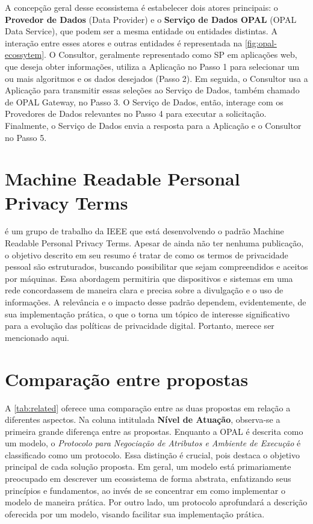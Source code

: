 A concepção geral desse ecossistema é estabelecer dois atores principais: o \textbf{Provedor de Dados} (Data Provider) e o \textbf{Serviço de Dados \acs{OPAL}} (OPAL Data Service), que podem ser a mesma entidade ou entidades distintas. A interação entre esses atores e outras entidades é representada na \autoref{fig:opal-ecossytem}. O Consultor, geralmente representado como \acs{SP} em aplicações web, que deseja obter informações, utiliza a Aplicação no Passo 1 para selecionar um ou mais algoritmos e os dados desejados (Passo 2). Em seguida, o Consultor usa a Aplicação para transmitir essas seleções ao Serviço de Dados, também chamado de OPAL Gateway, no Passo 3. O Serviço de Dados, então, interage com os Provedores de Dados relevantes no Passo 4 para executar a solicitação. Finalmente, o Serviço de Dados envia a resposta para a Aplicação e o Consultor no Passo 5.



\section{Machine Readable Personal Privacy Terms}

 é um grupo de trabalho da IEEE que está desenvolvendo o padrão Machine Readable Personal Privacy Terms. 
Apesar de ainda não ter nenhuma publicação, o objetivo descrito em seu resumo é tratar de como os termos de privacidade pessoal são estruturados, buscando possibilitar que sejam compreendidos e aceitos por máquinas.
Essa abordagem permitiria que dispositivos e sistemas em uma rede concordassem de maneira clara e precisa sobre a divulgação e o uso de informações. A relevância e o impacto desse padrão dependem, evidentemente, de sua implementação prática, o que o torna um tópico de interesse significativo para a evolução das políticas de privacidade digital. Portanto, merece ser mencionado aqui.

\section{Comparação entre propostas}



A \autoref{tab:related} oferece uma comparação entre as duas propostas em relação a diferentes aspectos. Na coluna intitulada \textbf{Nível de Atuação}, observa-se a primeira grande diferença entre as propostas. 
Enquanto a \acs{OPAL} é descrita como um modelo, o \emph{Protocolo para Negociação de Atributos e Ambiente de Execução} é classificado como um protocolo. 
Essa distinção é crucial, pois destaca o objetivo principal de cada solução proposta. Em geral, um modelo está primariamente preocupado em descrever um ecossistema de forma abstrata, enfatizando seus princípios e fundamentos, ao invés de se concentrar em como implementar o modelo de maneira prática. Por outro lado, um protocolo aprofundará a descrição oferecida por um modelo, visando facilitar sua implementação prática.


